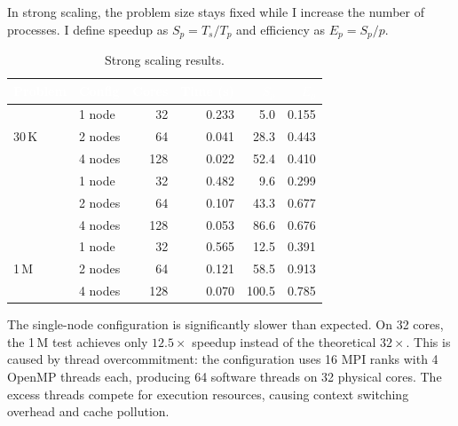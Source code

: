 \documentclass[10pt,dvipsnames,table,twocolumn]{article}
\begin{document}
In strong scaling, the problem size stays fixed while I increase the number of processes. I define speedup as $S_p = T_s / T_p$ and efficiency as $E_p = S_p / p$.

\begin{table}[t]
\centering
\caption{Strong scaling results.}\label{tbl:strong}
\small
\begin{tabular}{@{}llrrrr@{}}
\rowcolor{TableHead}
\textcolor{white}{\textbf{Problem}} &
\textcolor{white}{\textbf{Config}} &
\textcolor{white}{\textbf{Cores}} &
\textcolor{white}{\textbf{Time (s)}} &
\textcolor{white}{\textbf{$S_p$}} &
\textcolor{white}{\textbf{$E_p$}} \\
\midrule
\multirow{3}{*}{30\,K}
  & 1 node  & 32  & 0.233  & 5.0   & 0.155 \\
  & 2 nodes & 64  & 0.041  & 28.3  & 0.443 \\
  & 4 nodes & 128 & 0.022  & 52.4  & 0.410 \\
\midrule
\rowcolor{TableRowAlt}
\multirow{3}{*}{120\,K}
  & 1 node  & 32  & 0.482  & 9.6   & 0.299 \\
\rowcolor{TableRowAlt}
  & 2 nodes & 64  & 0.107  & 43.3  & 0.677 \\
\rowcolor{TableRowAlt}
  & 4 nodes & 128 & 0.053  & 86.6  & 0.676 \\
\midrule
\multirow{3}{*}{1\,M}
  & 1 node  & 32  & 0.565  & 12.5  & 0.391 \\
  & 2 nodes & 64  & 0.121  & 58.5  & 0.913 \\
  & 4 nodes & 128 & 0.070  & 100.5 & 0.785 \\
\bottomrule
\end{tabular}
\end{table}


The single-node configuration is significantly slower than expected. On 32 cores, the 1\,M test achieves only $12.5\times$ speedup instead of the theoretical $32\times$. This is caused by thread overcommitment: the configuration uses 16 MPI ranks with 4 OpenMP threads each, producing 64 software threads on 32 physical cores. The excess threads compete for execution resources, causing context switching overhead and cache pollution.
\end{document}
